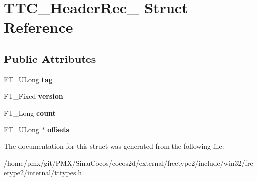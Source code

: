 \hypertarget{structTTC__HeaderRec__}{}\section{T\+T\+C\+\_\+\+Header\+Rec\+\_\+ Struct Reference}
\label{structTTC__HeaderRec__}
\subsection*{Public Attributes}
\begin{DoxyCompactItemize}
\item 
\mbox{\label{structTTC__HeaderRec___a7fc09906e402f8937b6ca207c84453b4}} 
F\+T\+\_\+\+U\+Long {\bfseries tag}
\item 
\mbox{\label{structTTC__HeaderRec___aa9ecb33279c68c3c00c1232441da5801}} 
F\+T\+\_\+\+Fixed {\bfseries version}
\item 
\mbox{\label{structTTC__HeaderRec___a0bf5898e9d8c55bc74f51712a5ad1b58}} 
F\+T\+\_\+\+Long {\bfseries count}
\item 
\mbox{\label{structTTC__HeaderRec___a2cc16a8b0f4389b431bc09f84114b52d}} 
F\+T\+\_\+\+U\+Long $\ast$ {\bfseries offsets}
\end{DoxyCompactItemize}


The documentation for this struct was generated from the following file\+:\begin{DoxyCompactItemize}
\item 
/home/pmx/git/\+P\+M\+X/\+Simu\+Cocos/cocos2d/external/freetype2/include/win32/freetype2/internal/tttypes.\+h\end{DoxyCompactItemize}

